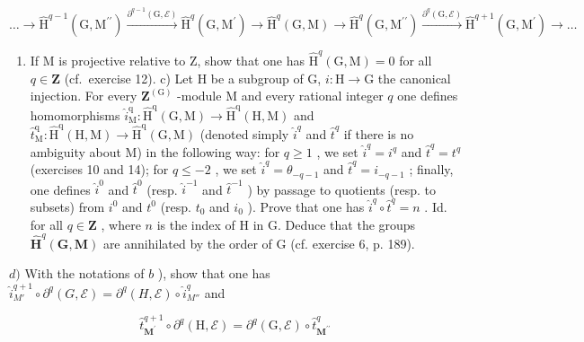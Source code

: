 \[
\dots \rightarrow \hat {\mathrm{H}} ^ {q - 1} (\mathrm{G}, \mathrm{M} ^ {\prime \prime}) \xrightarrow {\partial^ {q - 1} (\mathrm{G} , \mathcal {E})} \hat {\mathrm{H}} ^ {q} (\mathrm{G}, \mathrm{M} ^ {\prime}) \rightarrow \hat {\mathrm{H}} ^ {q} (\mathrm{G}, \mathrm{M}) \rightarrow \hat {\mathrm{H}} ^ {q} (\mathrm{G}, \mathrm{M} ^ {\prime \prime}) \xrightarrow {\partial^ {q} (\mathrm{G} , \mathcal {E})} \hat {\mathrm{H}} ^ {q + 1} (\mathrm{G}, \mathrm{M} ^ {\prime}) \rightarrow \dots
\]

\begin{enumerate}
\def\labelenumi{\alph{enumi})}
\setcounter{enumi}{1}
\tightlist
\item
  If M is projective relative to Z, show that one has \(\hat{\mathrm{H}}^{q}(\mathrm{G},\mathrm{M}) = 0\) for all \(q\in \mathbf{Z}\) (cf.~exercise 12). c) Let H be a subgroup of G, \(i:\mathrm{H}\to \mathrm{G}\) the canonical injection. For every \(\mathbf{Z}^{(\mathrm{G})}\) -module M and every rational integer \(q\) one defines homomorphisms \(\hat{i}_{\mathrm{M}}^{\mathrm{q}}:\hat{\mathrm{H}}^{\mathrm{q}}(\mathrm{G},\mathrm{M})\rightarrow \hat{\mathrm{H}}^{\mathrm{q}}(\mathrm{H},\mathrm{M})\) and \(\hat{t}_{\mathrm{M}}^{\mathrm{q}}:\hat{\mathrm{H}}^{\mathrm{q}}(\mathrm{H},\mathrm{M})\rightarrow \hat{\mathrm{H}}^{\mathrm{q}}(\mathrm{G},\mathrm{M})\) (denoted simply \(\hat{i}^q\) and \(\hat{t}^q\) if there is no ambiguity about M) in the following way: for \(q\geqslant 1\) , we set \(\hat{i}^q = i^q\) and \(\hat{t}^q = t^q\) (exercises 10 and 14); for \(q\leqslant -2\) , we set \(\hat{i}^q = \theta_{-q - 1}\) and \(\hat{t}^q = i_{-q - 1}\) ; finally, one defines \(\hat{i}^0\) and \(\hat{t}^0\) (resp. \(\hat{i}^{-1}\) and \(\hat{t}^{-1}\) ) by passage to quotients (resp. to subsets) from \(i^0\) and \(t^0\) (resp. \(t_0\) and \(i_0\) ). Prove that one has \(\hat{i}^q\circ \hat{t}^q = n\) . Id. for all \(q\in \mathbf{Z}\) , where \(n\) is the index of H in G. Deduce that the groups \(\hat{\mathbf{H}}^{q}(\mathbf{G},\mathbf{M})\) are annihilated by the order of G (cf. exercise 6, p. 189).
\end{enumerate}

\(d)\) With the notations of \(b\) ), show that one has \(\hat{i}_{M'}^{q+1} \circ \partial^q(G, \mathcal{E}) = \partial^q(H, \mathcal{E}) \circ \hat{i}_{M''}^q\) and

\[
\hat {t} _ {\mathbf {M} ^ {\prime}} ^ {q + 1} \circ \partial^ {q} (\mathrm{H}, \mathcal {E}) = \partial^ {q} (\mathrm{G}, \mathcal {E}) \circ \hat {t} _ {\mathbf {M} ^ {\prime \prime}} ^ {q}
\]

